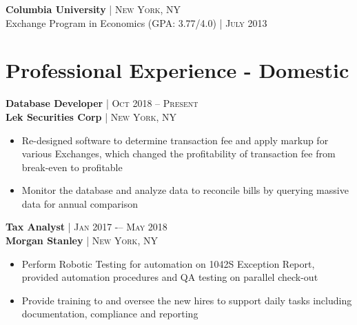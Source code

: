 \documentclass[10pt]{article} %
\begin{document}
{\begin{minipage}[t]{0.5\textwidth}
\textbf{Columbia University} {\hfill\footnotesize\textsc{| New York, NY}}\\
Exchange Program in Economics {\footnotesize\textsc{(GPA: 3.77/4.0)}} {\hfill\footnotesize\textsc{| July 2013}}





\section{Professional Experience - Domestic} 

{\raggedright\normalsize
\textbf{Database Developer} {\hfill\footnotesize\textsc{| Oct 2018 -- Present}}\\ 
\textbf{Lek Securities Corp} {\hfill\footnotesize\textsc{| New York, NY}}}

\begin{itemize}[leftmargin=*, topsep=2pt, partopsep=2.5pt]
\setlength\itemsep{1pt}

\item Re-designed software to determine transaction fee and apply markup for various Exchanges, which changed the profitability of transaction fee from break-even to profitable
\item Monitor the database and analyze data to reconcile bills by querying massive data for annual comparison

\end{itemize}


{\raggedright\normalsize
\textbf{Tax Analyst} {\hfill\footnotesize\textsc{| Jan 2017 -– May 2018 }}\\ 
\textbf{Morgan Stanley} {\hfill\footnotesize\textsc{| New York, NY}}}

\begin{itemize}[leftmargin=*, topsep=2pt, partopsep=2.5pt]
\setlength\itemsep{1pt}

\item Perform Robotic Testing for automation on 1042S Exception Report, provided automation procedures and QA testing on parallel check-out
 
\item Provide training to and oversee the new hires to support daily tasks including documentation, compliance and reporting
 

\end{itemize}
\end{minipage}}
\end{document}
